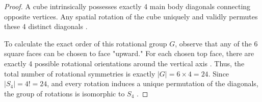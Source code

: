 \documentclass[11pt]{article}
\theoremstyle{definition}
\theoremstyle{plain}
\theoremstyle{remark}
\begin{document}
\begin{proof}
A cube intrinsically possesses exactly 4 main body diagonals connecting opposite vertices. Any spatial rotation of the cube uniquely and validly permutes these 4 distinct diagonals \cite{gallian}. 

To calculate the exact order of this rotational group $G$, observe that any of the 6 square faces can be chosen to face "upward." For each chosen top face, there are exactly 4 possible rotational orientations around the vertical axis \cite{fraleigh}. Thus, the total number of rotational symmetries is exactly $|G| = 6 \times 4 = 24$. Since $|S_4| = 4! = 24$, and every rotation induces a unique permutation of the diagonals, the group of rotations is isomorphic to $S_4$ \cite{dummit}.
\end{proof}
\end{document}
